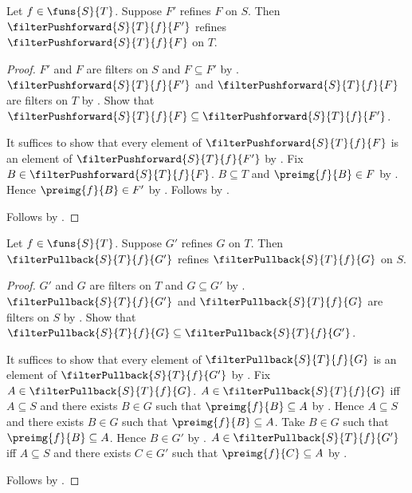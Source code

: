 \begin{theorem}\label{filter_pushforward_monotone}
    Let $f\in\funs{S}{T}$.
    Suppose $F'$ refines $F$ on $S$.
    Then $\filterPushforward{S}{T}{f}{F'}$ refines
        $\filterPushforward{S}{T}{f}{F}$ on $T$.
\end{theorem}
\begin{proof}
    $F'$ and $F$ are filters on $S$ and $F\subseteq F'$ by
        .
    $\filterPushforward{S}{T}{f}{F'}$ and
        $\filterPushforward{S}{T}{f}{F}$ are filters on $T$ by
        .
    Show that $\filterPushforward{S}{T}{f}{F}\subseteq
        \filterPushforward{S}{T}{f}{F'}$.
    \begin{subproof}
        It suffices to show that every element of
            $\filterPushforward{S}{T}{f}{F}$ is an element of
            $\filterPushforward{S}{T}{f}{F'}$ by .
        Fix $B\in\filterPushforward{S}{T}{f}{F}$.
        $B\subseteq T$ and $\preimg{f}{B}\in F$ by
            .
        Hence $\preimg{f}{B}\in F'$ by .
        Follows by .
    \end{subproof}
    Follows by .
\end{proof}

\begin{theorem}\label{filter_pullback_monotone}
    Let $f\in\funs{S}{T}$.
    Suppose $G'$ refines $G$ on $T$.
    Then $\filterPullback{S}{T}{f}{G'}$ refines
        $\filterPullback{S}{T}{f}{G}$ on $S$.
\end{theorem}
\begin{proof}
    $G'$ and $G$ are filters on $T$ and $G\subseteq G'$ by
        .
    $\filterPullback{S}{T}{f}{G'}$ and
        $\filterPullback{S}{T}{f}{G}$ are filters on $S$ by
        .
    Show that $\filterPullback{S}{T}{f}{G}\subseteq
        \filterPullback{S}{T}{f}{G'}$.
    \begin{subproof}
        It suffices to show that every element of
            $\filterPullback{S}{T}{f}{G}$ is an element of
            $\filterPullback{S}{T}{f}{G'}$ by .
        Fix $A\in\filterPullback{S}{T}{f}{G}$.
        $A\in\filterPullback{S}{T}{f}{G}$ iff
            $A\subseteq S$ and there exists $B\in G$ such that
            $\preimg{f}{B}\subseteq A$ by .
        Hence $A\subseteq S$ and there exists $B\in G$ such that
            $\preimg{f}{B}\subseteq A$.
        Take $B\in G$ such that $\preimg{f}{B}\subseteq A$.
        Hence $B\in G'$ by .
        $A\in\filterPullback{S}{T}{f}{G'}$ iff
            $A\subseteq S$ and there exists $C\in G'$ such that
            $\preimg{f}{C}\subseteq A$ by .
    \end{subproof}
    Follows by .
\end{proof}

